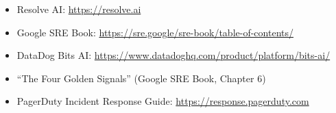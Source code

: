 \documentclass[a4paper]{article}
\begin{document}
\begin{itemize}
    \item Resolve AI: \url{https://resolve.ai}
    \item Google SRE Book: \url{https://sre.google/sre-book/table-of-contents/}
    \item DataDog Bits AI: \url{https://www.datadoghq.com/product/platform/bits-ai/}
    \item ``The Four Golden Signals'' (Google SRE Book, Chapter 6)
    \item PagerDuty Incident Response Guide: \url{https://response.pagerduty.com}
\end{itemize}

\end{document}
